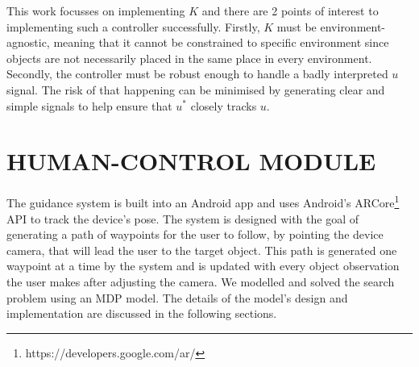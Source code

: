 \documentclass[a4paper, twoside]{article}
\begin{document}
This work focusses on implementing $K$ and there are 2 points of interest to implementing such a controller successfully. Firstly, $K$ must be environment-agnostic, meaning that it cannot be constrained to specific environment since objects are not necessarily placed in the same place in every environment. Secondly, the controller must be robust enough to handle a badly interpreted $u$ signal. The risk of that happening can be minimised by generating clear and simple signals to help ensure that $u^*$ closely tracks $u$. 

\section{\uppercase{Human-control Module}}\label{sec:controller-design}

\noindent The guidance system is built into an Android app and uses Android's ARCore\footnote{https://developers.google.com/ar/} API to track the device's pose. The system is designed with the goal of generating a path of waypoints for the user to follow, by pointing the device camera, that will lead the user to the target object. This path is generated one waypoint at a time by the system and is updated with every object observation the user makes after adjusting the camera. We modelled and solved the search problem using an MDP model. The details of the model's design and implementation are discussed in the following sections. %


\end{document}
